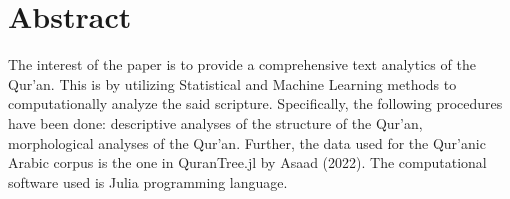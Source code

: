 \chapter*{Abstract}
The interest of the paper is to provide a comprehensive text analytics of the Qur'an. This is by utilizing Statistical and Machine Learning methods to computationally analyze the said scripture. Specifically, the following procedures have been done: descriptive analyses of the structure of the Qur'an, morphological analyses of the Qur'an. Further, the data used for the Qur'anic Arabic corpus is the one in QuranTree.jl by Asaad (2022). The computational software used is Julia programming language.